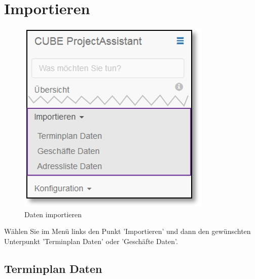 
\clearpage
\section{Importieren}
\label{bkm:Ref2018090701}

\begin{figure}   %
  \vspace{-35pt}      %
  \begin{center}
    \includegraphics[width=1\linewidth]{../chapters/12_Importieren/pictures/12_Menu_Importieren.jpg}
  \end{center}
  \vspace{-20pt}
  \caption{Daten importieren}
  \vspace{-10pt}
\end{figure}

Wählen Sie im Menü links den Punkt 'Importieren' und dann den gewünschten Unterpunkt 'Terminplan Daten' oder 'Geschäfte Daten'.

\vspace{6.5cm}

\subsection{Terminplan Daten}
\label{bkm:Ref445411998}

